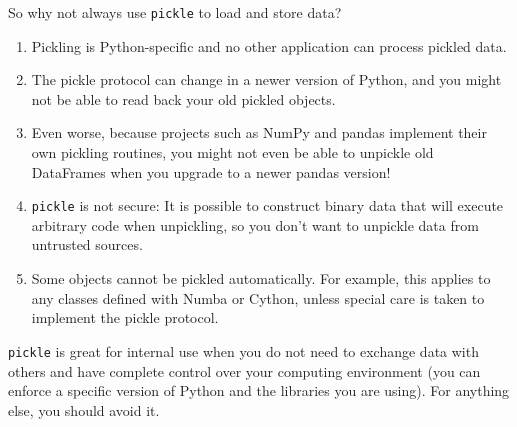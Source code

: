 \documentclass[10pt]{scrartcl}
\providecommand{\tightlist}{%
      \setlength{\itemsep}{0pt}\setlength{\parskip}{0pt}}
\begin{document}
So why not always use \texttt{pickle} to load and store data?

\begin{enumerate}
\def\labelenumi{\arabic{enumi}.}
\tightlist
\item
  Pickling is Python-specific and no other application can process
  pickled data.
\item
  The pickle protocol can change in a newer version of Python, and you
  might not be able to read back your old pickled objects.
\item
  Even worse, because projects such as NumPy and pandas implement their
  own pickling routines, you might not even be able to unpickle old
  DataFrames when you upgrade to a newer pandas version!
\item
  \texttt{pickle} is not secure: It is possible to construct binary data
  that will execute arbitrary code when unpickling, so you don't want to
  unpickle data from untrusted sources.
\item
  Some objects cannot be pickled automatically. For example, this
  applies to any classes defined with Numba or Cython, unless special
  care is taken to implement the pickle protocol.
\end{enumerate}

\texttt{pickle} is great for internal use when you do not need to
exchange data with others and have complete control over your computing
environment (\ie you can enforce a specific version of Python and the
libraries you are using). For anything else, you should avoid it.


    
    
    
\end{document}

